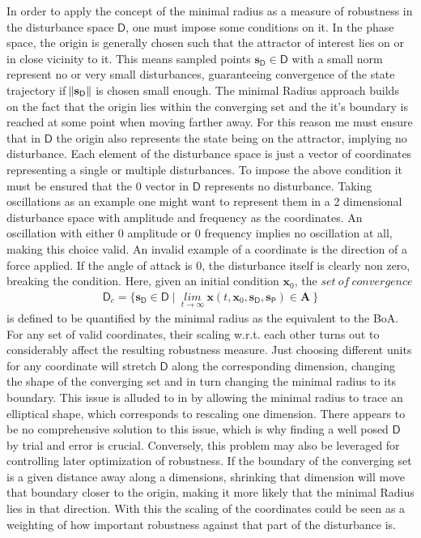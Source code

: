     In order to apply the concept of the minimal radius as a measure of robustness in the disturbance space $\mathsf{D}$, one must impose some conditions on it.
    In the phase space, the origin is generally chosen such that the attractor of interest lies on or in close vicinity to it. This means sampled points $\mathbf{s}_{\mathsf{D}} \in \mathsf{D}$ with a small norm represent no or very small disturbances, guaranteeing convergence of the state trajectory if $\norm{\mathbf{s}_{\mathsf{D}}}$ is chosen small enough. The minimal Radius approach builds on the fact that the origin lies within the converging set and the it's boundary is reached at some point when moving farther away. 
    For this reason me must ensure that in $\mathsf{D}$ the origin also represents the state being on the attractor, implying no disturbance.
    Each element of the disturbance space is just a vector of coordinates representing a single or multiple disturbances. To impose the above condition it must be ensured that the 0 vector in $\mathsf{D}$ represents no disturbance. 
    Taking oscillations as an example one might want to represent them in a 2 dimensional disturbance space with amplitude and frequency as the coordinates. An oscillation with either 0 amplitude or 0 frequency implies no oscillation at all, making this choice valid.
    An invalid example of a coordinate is the direction of a force applied. If the angle of attack is 0, the disturbance itself is clearly non zero, breaking the condition.
    Here, given an initial condition $\mathbf{x}_0$, the $set\ of\ convergence$ 
    \begin{gather} \label{eq:9}
    \mathsf{D}_c = \{ \mathbf{s}_{\mathsf{D}} \in \mathsf{D} \mid\ \underset{t \rightarrow \infty}{lim} \ \mathbf{x}(t,\mathbf{x}_0,\mathbf{s}_{\mathsf{D}},\mathbf{s}_{\mathsf{P}}) \in \mathbf{A}\ \}\end{gather}
    is defined to be quantified by the minimal radius as the equivalent to the BoA.
    For any set of valid coordinates, their scaling w.r.t. each other turns out to considerably affect the resulting robustness measure. Just choosing different units for any coordinate will stretch $\mathsf{D}$ along the corresponding dimension, changing the shape of the converging set and in turn changing the minimal radius to its boundary. This issue is alluded to in \cite{quant} by allowing the minimal radius to trace an elliptical shape, which corresponds to rescaling one dimension. There appears to be no comprehensive solution to this issue, which is why finding a well posed $\mathsf{D}$ by trial and error is crucial. 
    Conversely, this problem may also be leveraged for controlling later optimization of robustness. If the boundary of the converging set is a given distance away along a dimensions, shrinking that dimension will move that boundary closer to the origin, making it more likely that the minimal Radius lies in that direction. With this the scaling of the coordinates could be seen as a weighting of how important robustness against that part of the disturbance is. 


